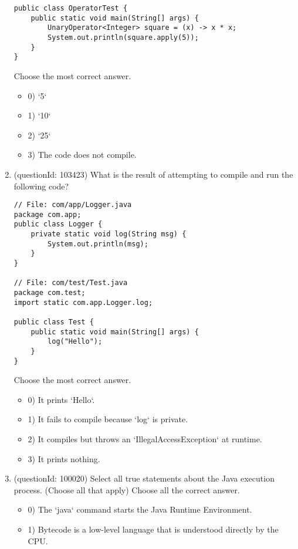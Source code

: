 \documentclass[12pt]{article}
\begin{document}
\begin{enumerate}[label=(\arabic*)]
\begin{verbatim}
public class OperatorTest {
    public static void main(String[] args) {
        UnaryOperator<Integer> square = (x) -> x * x;
        System.out.println(square.apply(5));
    }
}
\end{verbatim}
Choose the most correct answer. 
\begin{itemize}
\item 0) `5`

\item 1) `10`

\item 2) `25`

\item 3) The code does not compile.

\end{itemize}
\item (questionId: 103423) What is the result of attempting to compile and run the following code?
\begin{verbatim}
// File: com/app/Logger.java
package com.app;
public class Logger {
    private static void log(String msg) {
        System.out.println(msg);
    }
}

// File: com/test/Test.java
package com.test;
import static com.app.Logger.log;

public class Test {
    public static void main(String[] args) {
        log("Hello");
    }
}
\end{verbatim}
Choose the most correct answer. 
\begin{itemize}
\item 0) It prints `Hello`.

\item 1) It fails to compile because `log` is private.

\item 2) It compiles but throws an `IllegalAccessException` at runtime.

\item 3) It prints nothing.

\end{itemize}
\item (questionId: 100020) Select all true statements about the Java execution process. (Choose all that apply)
Choose all the correct answer.\begin{itemize}
\item 0) The `java` command starts the Java Runtime Environment.

\item 1) Bytecode is a low-level language that is understood directly by the CPU.


\end{itemize}
\end{enumerate}
\end{document}
